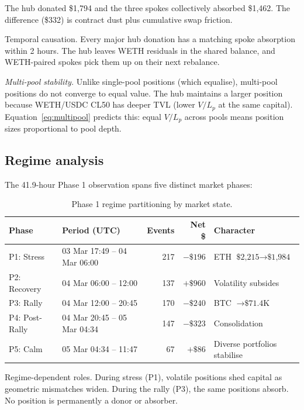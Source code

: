\documentclass[11pt,a4paper]{article}
\begin{document}
The hub donated \$1{,}794 and the three spokes collectively absorbed \$1{,}462. The difference (\$332) is contract dust plus cumulative swap friction.

Temporal causation. Every major hub donation has a matching spoke absorption within 2 hours. The hub leaves WETH residuals in the shared balance, and WETH-paired spokes pick them up on their next rebalance.

\emph{Multi-pool stability.} Unlike single-pool positions (which equalise), multi-pool positions do not converge to equal value. The hub maintains a larger position because WETH/USDC CL50 has deeper TVL (lower $V/L_p$ at the same capital). Equation~\eqref{eq:multipool} predicts this: equal $V/L_p$ across pools means position sizes proportional to pool depth.

\subsection{Regime analysis}\label{sec:regime}

The 41.9-hour Phase 1 observation spans five distinct market phases:

\begin{table}[H]
\centering
\caption{Phase 1 regime partitioning by market state.}\label{tab:regime}
\begin{tabular}{@{}llrrl@{}}
\toprule
Phase & Period (UTC) & Events & Net \$ & Character \\
\midrule
P1: Stress      & 03 Mar 17:49 -- 04 Mar 06:00 & 217 & $-\$196$ & ETH $\text{\$2{,}215} \to \text{\$1{,}984}$ \\
P2: Recovery    & 04 Mar 06:00 -- 12:00         & 137 & $+\$960$ & Volatility subsides \\
P3: Rally       & 04 Mar 12:00 -- 20:45         & 170 & $-\$240$ & BTC $\to \text{\$71.4K}$ \\
P4: Post-Rally  & 04 Mar 20:45 -- 05 Mar 04:34  & 147 & $-\$323$ & Consolidation \\
P5: Calm        & 05 Mar 04:34 -- 11:47         & 67  & $+\$86$  & Diverse portfolios stabilise \\
\bottomrule
\end{tabular}
\end{table}

Regime-dependent roles. During stress (P1), volatile positions shed capital as geometric mismatches widen. During the rally (P3), the same positions absorb. No position is permanently a donor or absorber.
\end{document}
